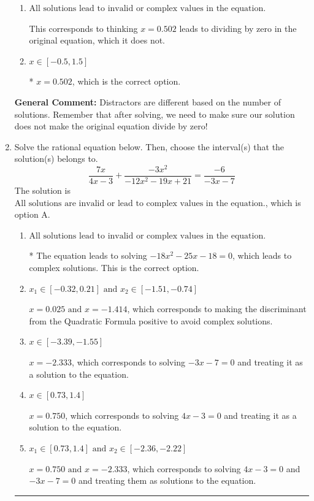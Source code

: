 \documentclass{extbook}[14pt]
\newcommand{\litem}[1]{\item #1

\rule{\textwidth}{0.4pt}}
\begin{document}
\begin{enumerate}
{\begin{enumerate}[label=\Alph*.]
$x = -0.387$, which corresponds to not distributing the factor $9x -4$ correctly when trying to eliminate the fraction.
\item \( \text{All solutions lead to invalid or complex values in the equation.} \)

This corresponds to thinking $x = 0.502$ leads to dividing by zero in the original equation, which it does not.
\item \( x \in [-0.5,1.5] \)

* $x = 0.502$, which is the correct option.
\end{enumerate}

\textbf{General Comment:} Distractors are different based on the number of solutions. Remember that after solving, we need to make sure our solution does not make the original equation divide by zero!
}
\litem{
Solve the rational equation below. Then, choose the interval(s) that the solution(s) belongs to.
\[ \frac{7x}{4x -3} + \frac{-3x^{2}}{-12x^{2} -19 x + 21} = \frac{-6}{-3x -7} \]The solution is \( \text{All solutions are invalid or lead to complex values in the equation.} \), which is option A.\begin{enumerate}[label=\Alph*.]
\item \( \text{All solutions lead to invalid or complex values in the equation.} \)

* The equation leads to solving $-18x^{2} -25 x -18=0$, which leads to complex solutions. This is the correct option.
\item \( x_1 \in [-0.32, 0.21] \text{ and } x_2 \in [-1.51,-0.74] \)

$x = 0.025 \text{ and } x = -1.414$, which corresponds to making the discriminant from the Quadratic Formula positive to avoid complex solutions.
\item \( x \in [-3.39,-1.55] \)

$x = -2.333$, which corresponds to solving $-3x -7 = 0$ and treating it as a solution to the equation.
\item \( x \in [0.73,1.4] \)

$x = 0.750$, which corresponds to solving $4x -3 = 0$ and treating it as a solution to the equation.
\item \( x_1 \in [0.73, 1.4] \text{ and } x_2 \in [-2.36,-2.22] \)

$x = 0.750 \text{ and } x = -2.333$, which corresponds to solving $4x -3 = 0$ and $-3x -7 = 0$ and treating them as solutions to the equation.
\end{enumerate}

}
\end{enumerate}
\end{document}
